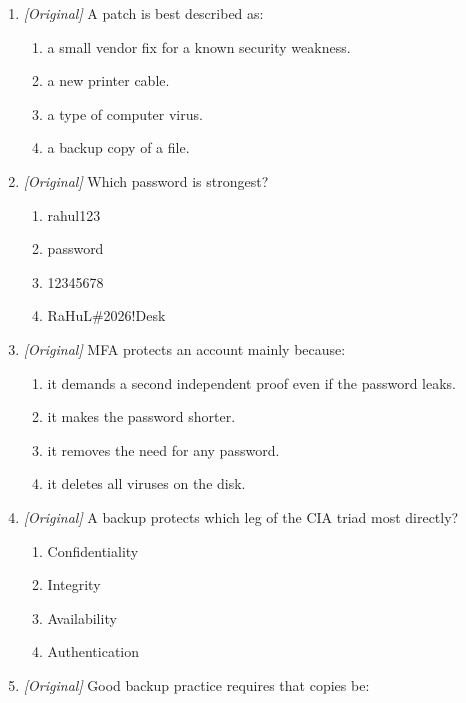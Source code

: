 \begin{enumerate}[label=\textbf{Q\arabic*.}, leftmargin=*]
\begin{enumerate}[label=\Alph*.]
    \item Clicking every link in unexpected prize-winning messages.
    \item Using a different strong password for each account.
  \end{enumerate}
\item \textit{[Original]} A patch is best described as:
  \begin{enumerate}[label=\Alph*.]
    \item a small vendor fix for a known security weakness.
    \item a new printer cable.
    \item a type of computer virus.
    \item a backup copy of a file.
  \end{enumerate}
\item \textit{[Original]} Which password is strongest?
  \begin{enumerate}[label=\Alph*.]
    \item rahul123
    \item password
    \item 12345678
    \item RaHuL\#2026!Desk
  \end{enumerate}
\item \textit{[Original]} MFA protects an account mainly because:
  \begin{enumerate}[label=\Alph*.]
    \item it demands a second independent proof even if the password leaks.
    \item it makes the password shorter.
    \item it removes the need for any password.
    \item it deletes all viruses on the disk.
  \end{enumerate}
\item \textit{[Original]} A backup protects which leg of the CIA triad most
  directly?
  \begin{enumerate}[label=\Alph*.]
    \item Confidentiality
    \item Integrity
    \item Availability
    \item Authentication
  \end{enumerate}
\item \textit{[Original]} Good backup practice requires that copies be:
  \begin{enumerate}[label=\Alph*.]

\end{enumerate}
\end{enumerate}
